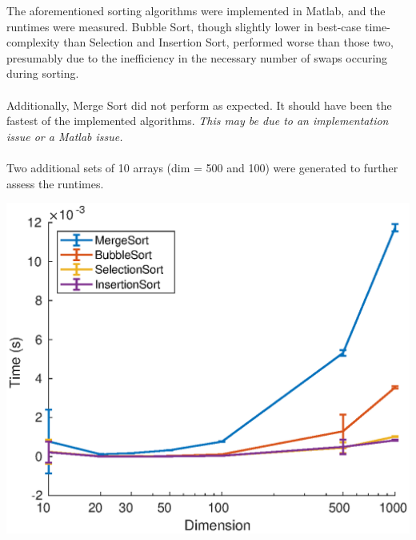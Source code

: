 \documentclass[12pt]{extarticle}
\begin{document}
The aforementioned sorting algorithms were implemented in Matlab, and the runtimes were measured. Bubble Sort, though slightly lower in best-case time-complexity than Selection and Insertion Sort, performed worse than those two, presumably due to the inefficiency in the necessary number of swaps occuring during sorting. 
\\ \\
Additionally, Merge Sort did not perform as expected. It should have been the fastest of the implemented algorithms. \textit{This may be due to an implementation issue or a Matlab issue. }
\\ \\
Two additional sets of 10 arrays (dim = 500 and 100) were generated to further assess the runtimes.
\begin{center}
\includegraphics[width = .8\textwidth]{part2}
\end{center}
\end{document}
